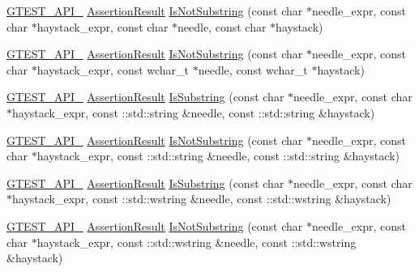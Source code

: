 \begin{DoxyCompactItemize}
\item 
\hyperlink{ts__gtest_8h_aa73be6f0ba4a7456180a94904ce17790}{G\-T\-E\-S\-T\-\_\-\-A\-P\-I\-\_\-} \hyperlink{classtesting_1_1AssertionResult}{Assertion\-Result} \hyperlink{namespacetesting_ab553b649b06ef2339cbd90f8dfa119f0}{Is\-Not\-Substring} (const char $\ast$needle\-\_\-expr, const char $\ast$haystack\-\_\-expr, const char $\ast$needle, const char $\ast$haystack)
\item 
\hyperlink{ts__gtest_8h_aa73be6f0ba4a7456180a94904ce17790}{G\-T\-E\-S\-T\-\_\-\-A\-P\-I\-\_\-} \hyperlink{classtesting_1_1AssertionResult}{Assertion\-Result} \hyperlink{namespacetesting_a28868925c50d541c8568a540b6457e54}{Is\-Not\-Substring} (const char $\ast$needle\-\_\-expr, const char $\ast$haystack\-\_\-expr, const wchar\-\_\-t $\ast$needle, const wchar\-\_\-t $\ast$haystack)
\item 
\hyperlink{ts__gtest_8h_aa73be6f0ba4a7456180a94904ce17790}{G\-T\-E\-S\-T\-\_\-\-A\-P\-I\-\_\-} \hyperlink{classtesting_1_1AssertionResult}{Assertion\-Result} \hyperlink{namespacetesting_a32718fab95b2833ab5ffc9cfc9f5c8b0}{Is\-Substring} (const char $\ast$needle\-\_\-expr, const char $\ast$haystack\-\_\-expr, const \-::std\-::string \&needle, const \-::std\-::string \&haystack)
\item 
\hyperlink{ts__gtest_8h_aa73be6f0ba4a7456180a94904ce17790}{G\-T\-E\-S\-T\-\_\-\-A\-P\-I\-\_\-} \hyperlink{classtesting_1_1AssertionResult}{Assertion\-Result} \hyperlink{namespacetesting_a645d822e47dc64b9923e78c880807f12}{Is\-Not\-Substring} (const char $\ast$needle\-\_\-expr, const char $\ast$haystack\-\_\-expr, const \-::std\-::string \&needle, const \-::std\-::string \&haystack)
\item 
\hyperlink{ts__gtest_8h_aa73be6f0ba4a7456180a94904ce17790}{G\-T\-E\-S\-T\-\_\-\-A\-P\-I\-\_\-} \hyperlink{classtesting_1_1AssertionResult}{Assertion\-Result} \hyperlink{namespacetesting_a2ff5c4d0c112d92b20232bd0cf173904}{Is\-Substring} (const char $\ast$needle\-\_\-expr, const char $\ast$haystack\-\_\-expr, const \-::std\-::wstring \&needle, const \-::std\-::wstring \&haystack)
\item 
\hyperlink{ts__gtest_8h_aa73be6f0ba4a7456180a94904ce17790}{G\-T\-E\-S\-T\-\_\-\-A\-P\-I\-\_\-} \hyperlink{classtesting_1_1AssertionResult}{Assertion\-Result} \hyperlink{namespacetesting_a2205435db77abd191fb8209bba41862a}{Is\-Not\-Substring} (const char $\ast$needle\-\_\-expr, const char $\ast$haystack\-\_\-expr, const \-::std\-::wstring \&needle, const \-::std\-::wstring \&haystack)
\item 

\end{DoxyCompactItemize}
